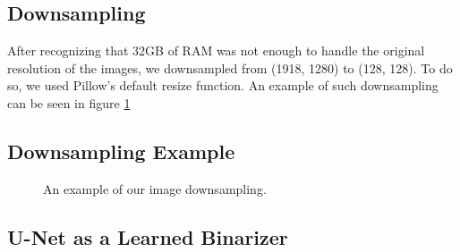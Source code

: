 \documentclass[paper=letter, fontsize=12pt]{article}
\numberwithin{equation}{section} %
\numberwithin{figure}{section} %
\numberwithin{table}{section} %
\begin{document}
\subsection{Downsampling}

After recognizing that 32GB of RAM was not enough to handle the original resolution
of the images, we downsampled from (1918, 1280) to (128, 128). To do so, we used
Pillow's default resize function. An example of such downsampling can be seen in
figure \ref{fig:downsampling}

\begin{appendixatend}
    \subsection{Downsampling Example}
    \begin{figure}
        \caption{An example of our image downsampling.}
        \label{fig:downsampling}
    \end{figure}
\end{appendixatend}

\subsection{U-Net as a Learned Binarizer}
\end{document}
